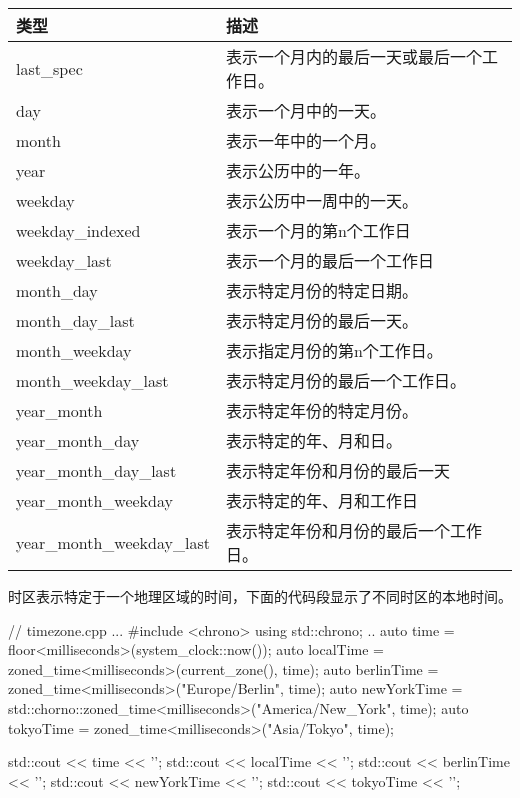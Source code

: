 \begin{longtable}[c]{|l|l|}
\hline
\textbf{类型}   & \textbf{描述}                                     \\ \hline
\endfirsthead
%
\endhead
%
last\_spec       & 表示一个月内的最后一天或最后一个工作日。           \\ \hline
day              & 表示一个月中的一天。                            \\ \hline
month            & 表示一年中的一个月。                           \\ \hline
year             & 表示公历中的一年。            \\ \hline
weekday          & 表示公历中一周中的一天。 \\ \hline
weekday\_indexed & 表示一个月的第n个工作日                  \\ \hline
weekday\_last    & 表示一个月的最后一个工作日                  \\ \hline
month\_day       & 表示特定月份的特定日期。          \\ \hline
month\_day\_last & 表示特定月份的最后一天。            \\ \hline
month\_weekday   & 表示指定月份的第n个工作日。        \\ \hline
month\_weekday\_last       & 表示特定月份的最后一个工作日。          \\ \hline
year\_month      & 表示特定年份的特定月份。         \\ \hline
year\_month\_day & 表示特定的年、月和日。             \\ \hline
year\_month\_day\_last     & 表示特定年份和月份的最后一天      \\ \hline
year\_month\_weekday       & 表示特定的年、月和工作日      \\ \hline
year\_month\_weekday\_last & 表示特定年份和月份的最后一个工作日。 \\ \hline
\end{longtable}



时区表示特定于一个地理区域的时间，下面的代码段显示了不同时区的本地时间。


\begin{cpp}
// timezone.cpp
...
#include <chrono>
using std::chrono;
..
auto time = floor<milliseconds>(system_clock::now());
auto localTime = zoned_time<milliseconds>(current_zone(), time);
auto berlinTime = zoned_time<milliseconds>("Europe/Berlin", time);
auto newYorkTime = std::chorno::zoned_time<milliseconds>("America/New_York", time);
auto tokyoTime = zoned_time<milliseconds>("Asia/Tokyo", time);

std::cout << time << '\n';
std::cout << localTime << '\n';
std::cout << berlinTime << '\n';
std::cout << newYorkTime << '\n';
std::cout << tokyoTime << '\n';
\end{cpp}


